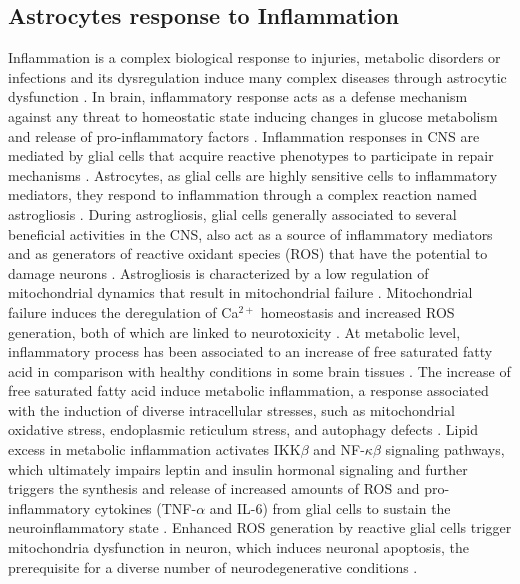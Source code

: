\subsection*{Astrocytes response to Inflammation}
Inflammation is a complex biological response to injuries, metabolic disorders or infections and its dysregulation induce many complex diseases through astrocytic dysfunction \cite{Masel2010,Yan2013,Jha2016}. In brain, inflammatory response acts as a defense mechanism against any threat to homeostatic state inducing changes in glucose metabolism and release of pro-inflammatory factors \cite{Allaman2011}. 
Inflammation responses in CNS are mediated by glial cells that acquire reactive phenotypes to participate in repair mechanisms \cite{Takuma2004,Fitch2008,Jha2016}. Astrocytes, as glial cells are highly sensitive cells to inflammatory mediators, they respond to inflammation through a complex reaction named astrogliosis \cite{Dowell2009a}. During astrogliosis, glial cells generally associated to several beneficial activities in the CNS, also act as a source of inflammatory mediators and as generators of reactive oxidant species (ROS) that have the potential to damage neurons \cite{Molofsk2012}. Astrogliosis is characterized by a low regulation of mitochondrial dynamics that result in mitochondrial failure \cite{Sidoryk-Wegrzynowicz2013}.  
Mitochondrial failure induces the deregulation of Ca$^{2+}$ homeostasis and increased ROS generation, both of which are linked to neurotoxicity \cite{Lange2012}. At metabolic level, inflammatory process has been associated to an increase of free saturated fatty acid in comparison with healthy conditions in some brain tissues \cite{Gupta2012}. The increase of free saturated fatty acid induce metabolic inflammation, a response associated with the induction of diverse intracellular stresses, such as mitochondrial oxidative stress, endoplasmic reticulum stress, and autophagy defects \cite{Jha2016}. 
Lipid excess in metabolic inflammation activates IKK$\beta$ and NF-$\kappa\beta$ signaling pathways, which ultimately impairs leptin and insulin hormonal signaling and further triggers the synthesis and release of increased amounts of ROS and pro-inflammatory cytokines (TNF-$\alpha$ and IL-6) from glial cells to sustain the neuroinflammatory state \cite{Purkayastha2015}. Enhanced ROS generation by reactive glial cells trigger mitochondria dysfunction in neuron, which induces neuronal apoptosis, the prerequisite for a diverse number of neurodegenerative conditions \cite{K.2006}.

